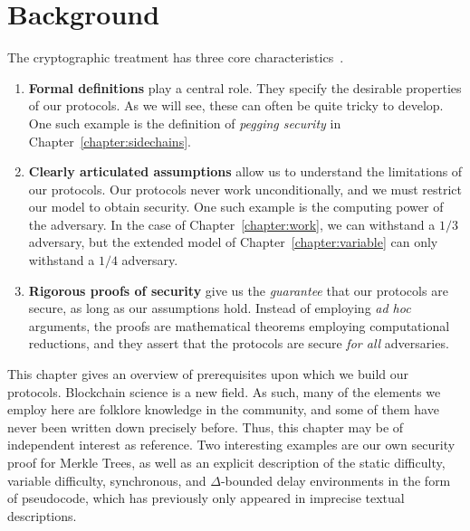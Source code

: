 \chapter{Background}\label{chapter:background}

The cryptographic treatment has three core characteristics~\cite{katz}.

\begin{enumerate}
  \item \textbf{Formal definitions} play a central role. They specify the
        desirable properties of our protocols. As we will see, these can often
        be quite tricky to develop. One such example is the definition of
        \emph{pegging security} in Chapter~\ref{chapter:sidechains}.
  \item \textbf{Clearly articulated assumptions} allow us to understand the
        limitations of our protocols. Our protocols never work
        unconditionally, and we must restrict our model to obtain security. One
        such example is the computing power of the adversary. In the case of
        Chapter~\ref{chapter:work}, we can withstand a $1/3$ adversary, but the
        extended model of Chapter~\ref{chapter:variable} can only withstand a
        $1/4$ adversary.
  \item \textbf{Rigorous proofs of security} give us the \emph{guarantee} that
        our protocols are secure, as long as our assumptions hold. Instead of
        employing \emph{ad hoc} arguments, the proofs are mathematical theorems
        employing computational reductions, and they assert that the protocols
        are secure \emph{for all} adversaries.
\end{enumerate}

This chapter gives an overview of prerequisites upon which we build our
protocols. Blockchain science is a new field. As such, many of the elements we
employ here are folklore knowledge in the community, and some of them have never
been written down precisely before. Thus, this chapter may be of independent
interest as reference. Two interesting examples are our own security proof for
Merkle Trees, as well as an explicit description of the static difficulty,
variable difficulty, synchronous, and $\Delta$-bounded delay environments in the
form of pseudocode, which has previously only appeared in imprecise textual
descriptions.





